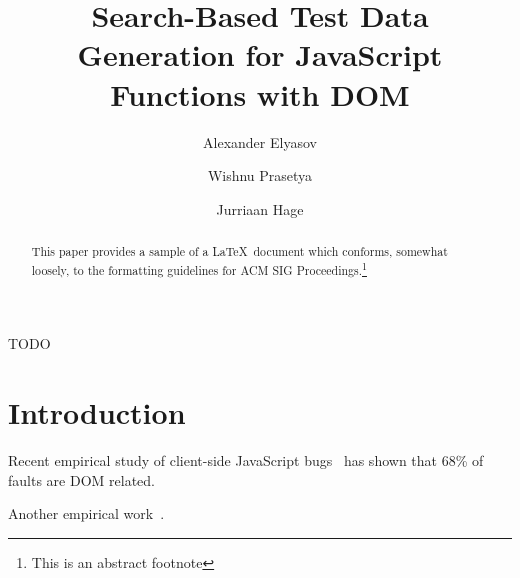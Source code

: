 \documentclass[sigconf]{acmart}
\begin{document}
\title{Search-Based Test Data Generation for JavaScript Functions with DOM}



\author{Alexander Elyasov}

\author{Wishnu Prasetya}

\author{Jurriaan Hage}


\begin{abstract}
This paper provides a sample of a \LaTeX\ document which conforms,
somewhat loosely, to the formatting guidelines for
ACM SIG Proceedings.\footnote{This is an abstract footnote}
\end{abstract}

%
%
\begin{CCSXML}
TODO 
\end{CCSXML}





\maketitle


\section{Introduction}
\label{sec.intro}
Recent empirical study of client-side JavaScript bugs~\cite{frolin:TSE16} has shown that 68\% of faults are DOM related.

Another empirical work~\cite{richards2010analysis}.
\end{document}
